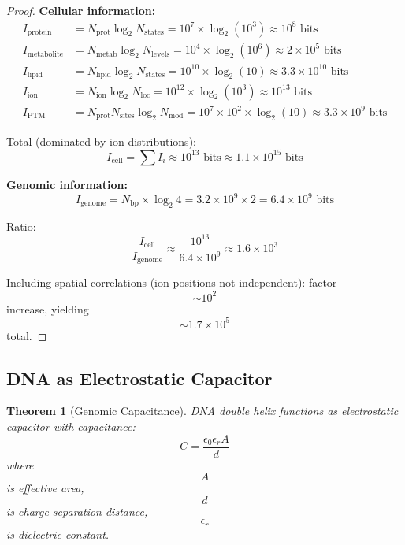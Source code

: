 \documentclass[11pt,twocolumn,a4paper]{article}
\newtheorem{theorem}{Theorem}[section]
\theoremstyle{remark}
\begin{document}
\begin{proof}
\textbf{Cellular information:}
\begin{align}
I_{\mathrm{protein}} &= N_{\mathrm{prot}} \log_2 N_{\mathrm{states}} = 10^7 \times \log_2(10^3) \approx 10^8 \text{ bits} \\
I_{\mathrm{metabolite}} &= N_{\mathrm{metab}} \log_2 N_{\mathrm{levels}} = 10^4 \times \log_2(10^6) \approx 2 \times 10^5 \text{ bits} \\
I_{\mathrm{lipid}} &= N_{\mathrm{lipid}} \log_2 N_{\mathrm{states}} = 10^{10} \times \log_2(10) \approx 3.3 \times 10^{10} \text{ bits} \\
I_{\mathrm{ion}} &= N_{\mathrm{ion}} \log_2 N_{\mathrm{loc}} = 10^{12} \times \log_2(10^3) \approx 10^{13} \text{ bits} \\
I_{\mathrm{PTM}} &= N_{\mathrm{prot}} N_{\mathrm{sites}} \log_2 N_{\mathrm{mod}} = 10^7 \times 10^2 \times \log_2(10) \approx 3.3 \times 10^9 \text{ bits}
\end{align}

Total (dominated by ion distributions):
$$
I_{\mathrm{cell}} = \sum I_i \approx 10^{13} \text{ bits} \approx 1.1 \times 10^{15} \text{ bits}
$$

\textbf{Genomic information:}
$$
I_{\mathrm{genome}} = N_{\mathrm{bp}} \times \log_2 4 = 3.2 \times 10^9 \times 2 = 6.4 \times 10^9 \text{ bits}
$$

Ratio:
$$
\frac{I_{\mathrm{cell}}}{I_{\mathrm{genome}}} \approx \frac{10^{13}}{6.4 \times 10^9} \approx 1.6 \times 10^3
$$

Including spatial correlations (ion positions not independent): factor $$\sim 10^2$$ increase, yielding $$\sim 1.7 \times 10^5$$ total.
\end{proof}

\subsection{DNA as Electrostatic Capacitor}

\begin{theorem}[Genomic Capacitance]
\label{thm:genomic_capacitance}
DNA double helix functions as electrostatic capacitor with capacitance:
$$
C = \frac{\epsilon_0 \epsilon_r A}{d}
$$
where $$A$$ is effective area, $$d$$ is charge separation distance, $$\epsilon_r$$ is dielectric constant.
\end{theorem}
\end{document}
